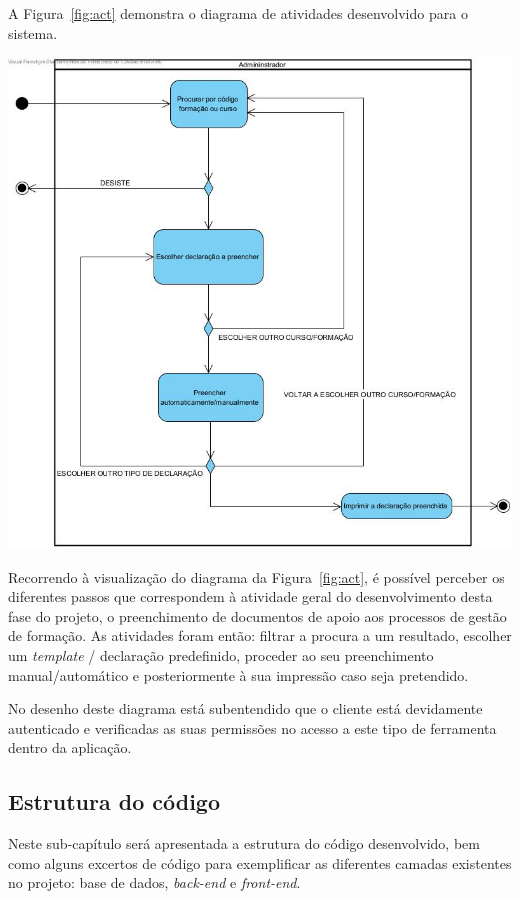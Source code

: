 A Figura~\ref{fig:act} demonstra o diagrama de atividades desenvolvido para o sistema.

\begin{center}
        \includegraphics[width=\textwidth,height=\textheight,keepaspectratio]{images/ActivityDiagram1.jpg}
        \label{fig:act}
\end{center}

Recorrendo à visualização do diagrama da Figura~\ref{fig:act}, é possível perceber os diferentes passos que correspondem à atividade geral do desenvolvimento desta fase do projeto, o preenchimento de documentos de apoio aos processos de gestão de formação. As atividades foram então: filtrar a procura a um resultado, escolher um \textit{template} / declaração predefinido, proceder ao seu preenchimento manual/automático e posteriormente à sua impressão caso seja pretendido.

No desenho deste diagrama está subentendido que o cliente está devidamente autenticado e verificadas as suas permissões no acesso a este tipo de ferramenta dentro da aplicação.

\subsection{Estrutura do código}
Neste sub-capítulo será apresentada a estrutura do código desenvolvido, bem como alguns excertos de código para exemplificar as diferentes camadas existentes no projeto: base de dados, \textit{back-end} e \textit{front-end}.

